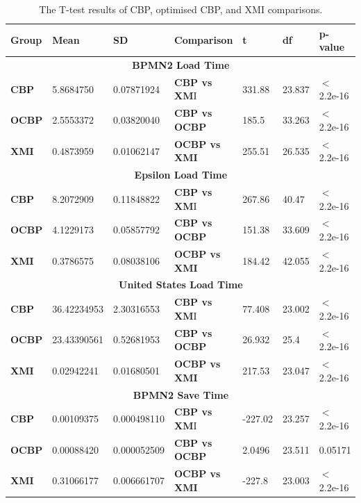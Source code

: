 \documentclass{llncs}
\begin{document}
    \setlength{\parskip}{0.1pt}
    \begin{table}[ht]
\small
\centering
\caption{The T-test results of CBP, optimised CBP, and XMI comparisons.}
\label{table:ttest_results}
    \begin{tabular}
{|p{}|p{}|p{}|p{}|p{}|p{}|p{}|}
\hline 

\textbf{Group} & \textbf{Mean} & \textbf{SD} & \textbf{Comparison} & \textbf{t}  & \textbf{df} & \textbf{p-value} \\  
\hline 
\multicolumn{7}{|c|}{\textbf{BPMN2 Load Time}} \\
\hline 
\textbf{CBP} & 5.8684750   &0.07871924 & \textbf{CBP vs XM}I & 331.88    &23.837 & $<$ 2.2e-16 \\  
\hline 
\textbf{OCBP} & 2.5553372  & 0.03820040 & \textbf{CBP vs OCBP} & 185.5 & 33.263  & $<$ 2.2e-16 \\  
\hline 
\textbf{XMI} & 0.4873959   & 0.01062147 & \textbf{OCBP vs XMI} & 255.51    & 26.535  & $<$ 2.2e-16 \\ 
\hline 

\multicolumn{7}{|c|}{\textbf{Epsilon Load Time}} \\
\hline 
\textbf{CBP} & 8.2072909    & 0.11848822 &  \textbf{CBP vs XM}I & 267.86   &40.47 & $<$ 2.2e-16 \\
\hline 
\textbf{OCBP} &  4.1229173  &  0.05857792 & \textbf{CBP vs OCBP} & 151.38 & 33.609 & $<$ 2.2e-16 \\  
\hline 
\textbf{XMI} & 0.3786575   & 0.08038106 & \textbf{OCBP vs XMI} & 184.42    &42.055  & $<$ 2.2e-16 \\ 
\hline 

\multicolumn{7}{|c|}{\textbf{United States Load Time}} \\
\hline 
\textbf{CBP} & 36.42234953     & 2.30316553 & \textbf{CBP vs XM}I &77.408   &23.002 & $<$ 2.2e-16 \\ 
       \hline 
       \textbf{OCBP} & 23.43390561  &  0.52681953 & \textbf{CBP vs OCBP} &  26.932 & 25.4 & $<$ 2.2e-16 \\ 
       \hline 
       \textbf{XMI} &  0.02942241  & 0.01680501 & \textbf{OCBP vs XMI} & 217.53   & 23.047 & $<$ 2.2e-16 \\ 
\hline 

       \multicolumn{7}{|c|}{\textbf{BPMN2 Save Time}} \\
       \hline 
       \textbf{CBP} &0.00109375    &0.000498110 & \textbf{CBP vs XM}I & -227.02    &23.257 & $<$ 2.2e-16 \\ 
       \hline 
       \textbf{OCBP} &0.00088420   &0.000052509  & \textbf{CBP vs OCBP} & 2.0496 & 23.511  &0.05171 \\
       \hline 
       \textbf{XMI} & 0.31066177   & 0.006661707 & \textbf{OCBP vs XMI} & -227.8    & 23.003  & $<$ 2.2e-16 \\ 
       \hline 
       

\end{tabular}
\end{table}
\end{document}
